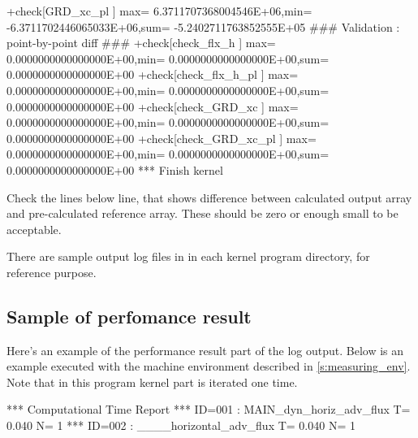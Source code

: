 \begin{LstLog}
 +check[GRD_xc_pl       ] max=  6.3711707368004546E+06,min= -6.3711702446065033E+06,sum= -5.2402711763852555E+05
 ### Validation : point-by-point diff ###
 +check[check_flx_h     ] max=  0.0000000000000000E+00,min=  0.0000000000000000E+00,sum=  0.0000000000000000E+00
 +check[check_flx_h_pl  ] max=  0.0000000000000000E+00,min=  0.0000000000000000E+00,sum=  0.0000000000000000E+00
 +check[check_GRD_xc    ] max=  0.0000000000000000E+00,min=  0.0000000000000000E+00,sum=  0.0000000000000000E+00
 +check[check_GRD_xc_pl ] max=  0.0000000000000000E+00,min=  0.0000000000000000E+00,sum=  0.0000000000000000E+00
 *** Finish kernel
\end{LstLog}

Check the lines below  line,
that shows difference between calculated output array and
pre-calculated reference array.
These should be zero or enough small to be acceptable.

There are sample output log files in 
in each kernel program directory, for reference purpose.

\subsection{Sample of perfomance result}

Here's an example of the performance result part of the log output.
Below is an example executed with the machine environment described in \autoref{s:measuring_env}.
%
Note that in this program kernel part is iterated one time.

\begin{LstLog}
 *** Computational Time Report
 *** ID=001 : MAIN_dyn_horiz_adv_flux          T=     0.040 N=      1
 *** ID=002 : ____horizontal_adv_flux          T=     0.040 N=      1
\end{LstLog}
